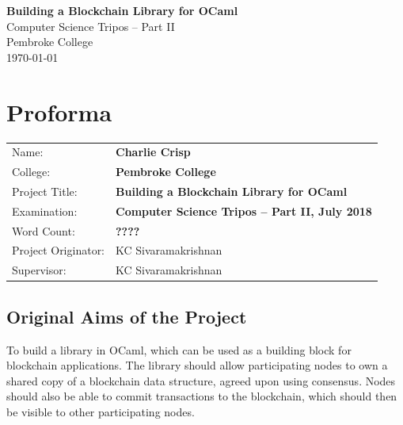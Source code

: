 \documentclass[12pt,a4paper,twoside,openright]{report}
\begin{document}
	
	
	
	
	\pagestyle{empty}
	
	
	\vspace*{60mm}
	\begin{center}
	\Huge
	\textbf{Building a Blockchain Library for OCaml} \\[5mm]
	Computer Science Tripos -- Part II \\[5mm]
	Pembroke College \\[5mm]
	\today  %
	\end{center}
	
	
	\pagestyle{plain}
	
	\chapter*{Proforma}
	
	{\large
	\begin{tabular}{ll}
	Name:               & \bf Charlie Crisp                       \\
	College:            & \bf Pembroke College                     \\
	Project Title:      & \bf Building a Blockchain Library for OCaml \\
	Examination:        & \bf Computer Science Tripos -- Part II, July 2018  \\
	Word Count:         & \bf ????\footnotemark[1]\\
	Project Originator: & KC Sivaramakrishnan                    \\
	Supervisor:         & KC Sivaramakrishnan                    
	\end{tabular}
	}
	
	
	\section*{Original Aims of the Project}
	
	To build a library in OCaml, which can be used as a building block for blockchain applications. 
	The library should allow participating nodes to own a shared copy of a blockchain data structure, agreed upon using consensus.
	Nodes should also be able to commit transactions to the blockchain, which should then be visible to other participating nodes. 
	
\end{document}

